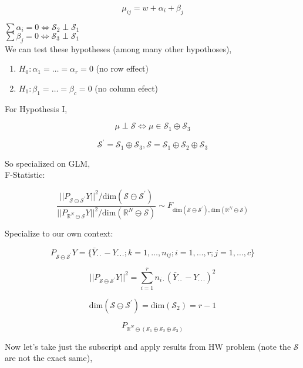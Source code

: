\documentclass[11pt,fleqn]{book} %
\begin{document}
		$$\mu_{ij} = w + \alpha_i + \beta_j $$ 

$\sum \alpha_i = 0 \Leftrightarrow \mathcal{S}_2 \perp \mathcal{S}_1$\\
$\sum \beta_j = 0 \Leftrightarrow \mathcal{S}_3 \perp \mathcal{S}_1$\\


We can test these hypotheses (among many other hypothoses), \\

		\begin{enumerate}[label = \Roman*]
			\item $H_0: \alpha_1 = \dots = \alpha_r = 0$ (no row effect)
			\item $H_1: \beta_1 = \dots = \beta_c = 0$ (no column efect)
		\end{enumerate}



For Hypothesis I, 

		$$\mu \perp \mathcal{S} \Leftrightarrow \mu \in \mathcal{S}_1 \oplus \mathcal{S}_3 $$

		$$\mathcal{S}^\prime = \mathcal{S}_1 \oplus \mathcal{S}_3, \mathcal{S} = \mathcal{S}_1 \oplus \mathcal{S}_2 \oplus \mathcal{S}_3 $$

So specialized on GLM, \\

	F-Statistic: 

			$$\frac{||P_{\mathcal{S} \ominus \mathcal{S}^\prime} Y || ^2 / \text{dim}(\mathcal{S} \ominus \mathcal{S}^\prime)}{|| P_{\mathbb{R}^N \ominus \mathcal{S}} Y|| ^2 / \text{dim}(\mathbb{R}^N \ominus \mathcal{S})} \sim F_{\text{dim}(\mathcal{S} \ominus \mathcal{S}^\prime), \text{dim}(\mathbb{R}^N \ominus \mathcal{S})} $$

	Specialize to our own context: 

			$$P_{\mathcal{S} \ominus \mathcal{S}^\prime} Y = \{\bar{Y}_{\cdot \cdot} - Y_{\cdot \cdot \cdot}; k= 1, \dots, n_{ij}; i = 1, \dots, r; j = 1, \dots, c \} $$

			$$||P_{\mathcal{S} \ominus \mathcal{S}^\prime} Y||^2 = \sum^r_{i=1} n_{i \cdot} (\bar{Y}_{\cdot \cdot} - Y_{\cdot \cdot \cdot})^2 $$


			$$\text{dim}(\mathcal{S} \ominus \mathcal{S}^\prime) = \text{dim}(\mathcal{S}_2) = r - 1 $$

			$$P_{\mathbb{R}^N \ominus (\mathcal{S}_1 \oplus \mathcal{S}_2 \oplus \mathcal{S}_3)}  $$

Now let's take just the subscript and apply results from HW problem (note the $\mathcal{S}$ are not the exact same), 
\end{document}
